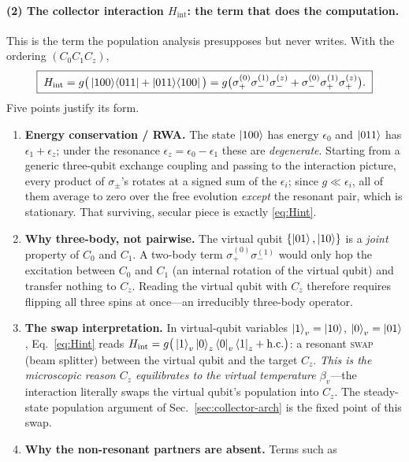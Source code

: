 \documentclass[11pt,a4paper]{article}
\theoremstyle{definition}
\theoremstyle{remark}
\begin{document}
\paragraph{(2) The collector interaction $H_{\mathrm{int}}$: the term
that does the computation.}
This is the term the population analysis presupposes but never writes.
With the ordering $(C_0C_1C_z)$,
\begin{equation}
\boxed{\;
H_{\mathrm{int}}
= g\big(\ket{100}\!\bra{011}+\ket{011}\!\bra{100}\big)
= g\big(\sigma_+^{(0)}\sigma_-^{(1)}\sigma_-^{(z)}
       +\sigma_-^{(0)}\sigma_+^{(1)}\sigma_+^{(z)}\big).
\;}
\label{eq:Hint}
\end{equation}
Five points justify its form.
\begin{enumerate}[label=(\roman*),leftmargin=*]
\item \textbf{Energy conservation / RWA.} The state $\ket{100}$ has
energy $\epsilon_0$ and $\ket{011}$ has $\epsilon_1+\epsilon_z$; under
the resonance $\epsilon_z=\epsilon_0-\epsilon_1$ these are
\emph{degenerate}. Starting from a generic three-qubit exchange
coupling and passing to the interaction picture, every product of
$\sigma_\pm$'s rotates at a signed sum of the $\epsilon_i$; since
$g\ll\epsilon_i$, all of them average to zero over the free evolution
\emph{except} the resonant pair, which is stationary. That surviving,
secular piece is exactly \eqref{eq:Hint}.
\item \textbf{Why three-body, not pairwise.} The virtual qubit
$\{\ket{01},\ket{10}\}$ is a \emph{joint} property of $C_0$ and $C_1$.
A two-body term $\sigma_+^{(0)}\sigma_-^{(1)}$ would only hop the
excitation between $C_0$ and $C_1$ (an internal rotation of the virtual
qubit) and transfer nothing to $C_z$. Reading the virtual qubit with
$C_z$ therefore requires flipping all three spins at once---an
irreducibly three-body operator.
\item \textbf{The swap interpretation.} In virtual-qubit variables
$\ket{1}_v=\ket{10}$, $\ket{0}_v=\ket{01}$, Eq.~\eqref{eq:Hint} reads
$H_{\mathrm{int}}=g\big(\ket{1}_v\ket{0}_z\bra{0}_v\bra{1}_z
+\mathrm{h.c.}\big)$: a resonant \textsc{swap} (beam splitter) between
the virtual qubit and the target $C_z$. \emph{This is the microscopic
reason $C_z$ equilibrates to the virtual temperature $\beta_v$}---the
interaction literally swaps the virtual qubit's population into $C_z$.
The steady-state population argument of Sec.~\ref{sec:collector-arch}
is the fixed point of this swap.
\item \textbf{Why the non-resonant partners are absent.} Terms such as

\end{enumerate}
\end{document}
